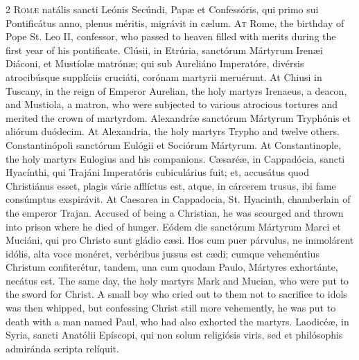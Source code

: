 \begin{paracol}{2}
\lettrine[lines=2]{R}{omæ} natális sancti 
 Leónis Secúndi, Papæ et Confessóris, qui primo sui Pontificátus anno, plenus 
 méritis, migrávit in cælum.
\switchcolumn
{}
\lettrine[lines=2]{A}{t} Rome, the birthday of Pope St. 
 Leo II, confessor, who passed to heaven filled with merits during the first 
 year of his pontificate.
\switchcolumn*
{}
Clúsii, in Etrúria, 
 sanctórum Mártyrum Irenæi Diáconi, et Mustíolæ matrónæ; qui sub Aureliáno 
 Imperatóre, divérsis atrocibúsque supplíciis cruciáti, corónam martyrii 
 meruérunt.
\switchcolumn
{}
At Chiusi in Tuscany, in the reign 
 of Emperor Aurelian, the holy martyrs Irenaeus, a deacon, and Mustiola, a 
 matron, who were subjected to various atrocious tortures and merited the 
 crown of martyrdom.
\switchcolumn*
{}
Alexandríæ sanctórum 
 Mártyrum Tryphónis et aliórum duódecim.
\switchcolumn
{}
At Alexandria, the holy martyrs 
 Trypho and twelve others.
\switchcolumn*
{}
Constantinópoli 
 sanctórum Eulógii et Sociórum Mártyrum.
\switchcolumn
{}
At Constantinople, the holy martyrs 
 Eulogius and his companions.
\switchcolumn*
{}
Cæsaréæ, in Cappadócia, 
 sancti Hyacínthi, qui Trajáni Imperatóris cubiculárius fuit; et, accusátus 
 quod Christiánus esset, plagis várie afflíctus est, atque, in cárcerem 
 trusus, ibi fame consúmptus exspirávit.
\switchcolumn
{}
At Caesarea in Cappadocia, St. 
 Hyacinth, chamberlain of the emperor Trajan. Accused of being a 
 Christian, he was scourged and thrown into prison where he died of hunger.
\switchcolumn*
{}
Eódem die sanctórum 
 Mártyrum Marci et Muciáni, qui pro Christo sunt gládio cæsi. Hos cum 
 puer párvulus, ne immolárent idólis, alta voce monéret, verbéribus jussus 
 est cædi; cumque veheméntius Christum confiterétur, tandem, una cum quodam 
 Paulo, Mártyres exhortánte, necátus est.
\switchcolumn
{}
The same day, the holy martyrs Mark 
 and Mucian, who were put to the sword for Christ. A small boy who 
 cried out to them not to sacrifice to idols was then whipped, but confessing 
 Christ still more vehemently, he was put to death with a man named Paul, who 
 had also exhorted the martyrs.
\switchcolumn*
{}
Laodicéæ, in Syria, 
 sancti Anatólii Epíscopi, qui non solum religiósis viris, sed et philósophis 
 admiránda scripta relíquit.
\switchcolumn

\end{paracol}
